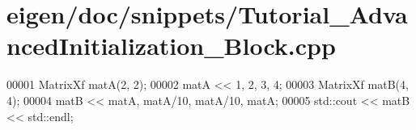 \hypertarget{eigen_2doc_2snippets_2_tutorial___advanced_initialization___block_8cpp_source}{}\section{eigen/doc/snippets/\+Tutorial\+\_\+\+Advanced\+Initialization\+\_\+\+Block.cpp}
\label{eigen_2doc_2snippets_2_tutorial___advanced_initialization___block_8cpp_source}

\begin{DoxyCode}
00001 MatrixXf matA(2, 2);
00002 matA << 1, 2, 3, 4;
00003 MatrixXf matB(4, 4);
00004 matB << matA, matA/10, matA/10, matA;
00005 std::cout << matB << std::endl;
\end{DoxyCode}

